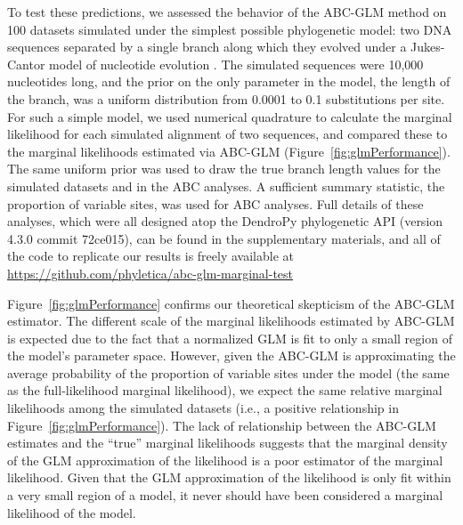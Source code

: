 To test these predictions, we assessed the behavior of the ABC-GLM
method on 100 datasets simulated under the simplest possible phylogenetic
model: two DNA sequences separated by a single branch along which they evolved
under a Jukes-Cantor model of nucleotide evolution \citep{JC1969}.
The simulated sequences were 10,000 nucleotides long, and the prior on the only
parameter in the model, the length of the branch, was a uniform distribution
from 0.0001 to 0.1 substitutions per site.
For such a simple model, we used numerical quadrature to calculate the marginal
likelihood for each simulated alignment of two sequences, and compared these to
the marginal likelihoods estimated via ABC-GLM
(Figure~\ref{fig:glmPerformance}).
The same uniform prior was used to draw the true branch length values for the
simulated datasets and in the ABC analyses.
A sufficient summary statistic, the proportion of variable sites, was used for
ABC analyses.
Full details of these analyses, which were all designed atop the DendroPy
phylogenetic API (version 4.3.0 commit 72ce015), can be found in the
supplementary materials, and all of the code to replicate our results is freely
available at
\href{https://github.com/phyletica/abc-glm-marginal-test}{https://github.com/phyletica/abc-glm-marginal-test}

Figure~\ref{fig:glmPerformance} confirms our theoretical skepticism of the
ABC-GLM estimator.
The different scale of the marginal likelihoods estimated by ABC-GLM is
expected due to the fact that a normalized GLM is fit to only a small
region of the model's parameter space.
However, given the ABC-GLM is approximating the average probability of the
proportion of variable sites under the model (the same as the full-likelihood
marginal likelihood), we expect the same relative marginal likelihoods among
the simulated datasets (i.e., a positive relationship in
Figure~\ref{fig:glmPerformance}).
The lack of relationship between the ABC-GLM estimates and the ``true''
marginal likelihoods suggests that the marginal density of the GLM
approximation of the likelihood is a poor estimator of the marginal likelihood.
Given that the GLM approximation of the likelihood is only fit within a very
small region of a model, it never should have been considered a marginal
likelihood of the model.

